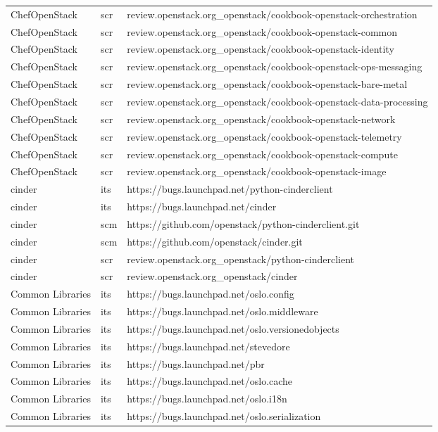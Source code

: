 \begin{center}
\begin{longtable}{|p{4cm}|p{1cm}|p{10cm}|}
ChefOpenStack&scr&review.openstack.org\_openstack/cookbook-openstack-orchestration\\ 
ChefOpenStack&scr&review.openstack.org\_openstack/cookbook-openstack-common\\ 
ChefOpenStack&scr&review.openstack.org\_openstack/cookbook-openstack-identity\\ 
ChefOpenStack&scr&review.openstack.org\_openstack/cookbook-openstack-ops-messaging\\ 
ChefOpenStack&scr&review.openstack.org\_openstack/cookbook-openstack-bare-metal\\ 
ChefOpenStack&scr&review.openstack.org\_openstack/cookbook-openstack-data-processing\\ 
ChefOpenStack&scr&review.openstack.org\_openstack/cookbook-openstack-network\\ 
ChefOpenStack&scr&review.openstack.org\_openstack/cookbook-openstack-telemetry\\ 
ChefOpenStack&scr&review.openstack.org\_openstack/cookbook-openstack-compute\\ 
ChefOpenStack&scr&review.openstack.org\_openstack/cookbook-openstack-image\\ 
cinder&its&https://bugs.launchpad.net/python-cinderclient\\ 
cinder&its&https://bugs.launchpad.net/cinder\\ 
cinder&scm&https://github.com/openstack/python-cinderclient.git\\ 
cinder&scm&https://github.com/openstack/cinder.git\\ 
cinder&scr&review.openstack.org\_openstack/python-cinderclient\\ 
cinder&scr&review.openstack.org\_openstack/cinder\\ 
Common Libraries&its&https://bugs.launchpad.net/oslo.config\\ 
Common Libraries&its&https://bugs.launchpad.net/oslo.middleware\\ 
Common Libraries&its&https://bugs.launchpad.net/oslo.versionedobjects\\ 
Common Libraries&its&https://bugs.launchpad.net/stevedore\\ 
Common Libraries&its&https://bugs.launchpad.net/pbr\\ 
Common Libraries&its&https://bugs.launchpad.net/oslo.cache\\ 
Common Libraries&its&https://bugs.launchpad.net/oslo.i18n\\ 
Common Libraries&its&https://bugs.launchpad.net/oslo.serialization\\ 

\end{longtable}
\end{center}
